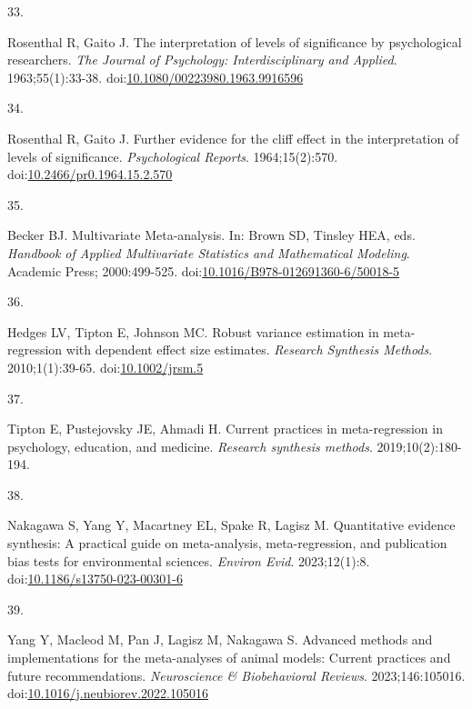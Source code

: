\documentclass[
  american,
  man, donotrepeattitle,floatsintext]{apa7}
\newlength{\cslhangindent}
\newlength{\csllabelwidth}
\newenvironment{CSLReferences}[2] %
 {\begin{list}{}{%
  \setlength{\itemindent}{0pt}
  \setlength{\leftmargin}{0pt}
  \setlength{\parsep}{0pt}
  \ifodd #1
   \setlength{\leftmargin}{\cslhangindent}
   \setlength{\itemindent}{-1\cslhangindent}
  \fi
  \setlength{\itemsep}{#2\baselineskip}}}
 {\end{list}}
\newcommand{\CSLLeftMargin}[1]{\parbox[t]{\csllabelwidth}{\strut#1\strut}}
\newcommand{\CSLRightInline}[1]{\parbox[t]{\linewidth - \csllabelwidth}{\strut#1\strut}}
\begin{document}
\begin{CSLReferences}{0}{1}
\CSLLeftMargin{33. }%
\CSLRightInline{Rosenthal R, Gaito J. The interpretation of levels of significance by psychological researchers. \emph{The Journal of Psychology: Interdisciplinary and Applied}. 1963;55(1):33-38. doi:\href{https://doi.org/10.1080/00223980.1963.9916596}{10.1080/00223980.1963.9916596}}

\CSLLeftMargin{34. }%
\CSLRightInline{Rosenthal R, Gaito J. Further evidence for the cliff effect in the interpretation of levels of significance. \emph{Psychological Reports}. 1964;15(2):570. doi:\href{https://doi.org/10.2466/pr0.1964.15.2.570}{10.2466/pr0.1964.15.2.570}}

\CSLLeftMargin{35. }%
\CSLRightInline{Becker BJ. {Multivariate Meta-analysis}. In: Brown SD, Tinsley HEA, eds. \emph{Handbook of Applied Multivariate Statistics and Mathematical Modeling}. Academic Press; 2000:499-525. doi:\href{https://doi.org/10.1016/B978-012691360-6/50018-5}{10.1016/B978-012691360-6/50018-5}}

\CSLLeftMargin{36. }%
\CSLRightInline{Hedges LV, Tipton E, Johnson MC. {Robust variance estimation in meta-regression with dependent effect size estimates}. \emph{Research Synthesis Methods}. 2010;1(1):39-65. doi:\href{https://doi.org/10.1002/jrsm.5}{10.1002/jrsm.5}}

\CSLLeftMargin{37. }%
\CSLRightInline{Tipton E, Pustejovsky JE, Ahmadi H. Current practices in meta-regression in psychology, education, and medicine. \emph{Research synthesis methods}. 2019;10(2):180-194.}

\CSLLeftMargin{38. }%
\CSLRightInline{Nakagawa S, Yang Y, Macartney EL, Spake R, Lagisz M. Quantitative evidence synthesis: A practical guide on meta-analysis, meta-regression, and publication bias tests for environmental sciences. \emph{Environ Evid}. 2023;12(1):8. doi:\href{https://doi.org/10.1186/s13750-023-00301-6}{10.1186/s13750-023-00301-6}}

\CSLLeftMargin{39. }%
\CSLRightInline{Yang Y, Macleod M, Pan J, Lagisz M, Nakagawa S. Advanced methods and implementations for the meta-analyses of animal models: {Current} practices and future recommendations. \emph{Neuroscience \& Biobehavioral Reviews}. 2023;146:105016. doi:\href{https://doi.org/10.1016/j.neubiorev.2022.105016}{10.1016/j.neubiorev.2022.105016}}


\end{CSLReferences}
\end{document}
